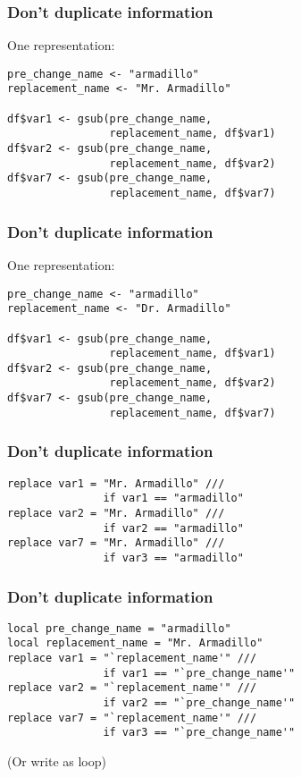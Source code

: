 \documentclass[11pt]{beamer}
\begin{document}
\begin{frame}[fragile]\frametitle{Don't duplicate information}
One representation:
\vspace{0.5cm}
\begin{verbatim}
pre_change_name <- "armadillo"
replacement_name <- "Mr. Armadillo"

df$var1 <- gsub(pre_change_name,
                replacement_name, df$var1)
df$var2 <- gsub(pre_change_name,
                replacement_name, df$var2)
df$var7 <- gsub(pre_change_name,
                replacement_name, df$var7)
\end{verbatim}
\end{frame}


\begin{frame}[fragile]\frametitle{Don't duplicate information}
One representation:
\vspace{1cm}
\begin{verbatim}
pre_change_name <- "armadillo"
replacement_name <- "Dr. Armadillo"

df$var1 <- gsub(pre_change_name,
                replacement_name, df$var1)
df$var2 <- gsub(pre_change_name,
                replacement_name, df$var2)
df$var7 <- gsub(pre_change_name,
                replacement_name, df$var7)
\end{verbatim}
\end{frame}


\begin{frame}[fragile]\frametitle{Don't duplicate information}
\begin{verbatim}
replace var1 = "Mr. Armadillo" ///
               if var1 == "armadillo"
replace var2 = "Mr. Armadillo" ///
               if var2 == "armadillo"
replace var7 = "Mr. Armadillo" ///
               if var3 == "armadillo"
\end{verbatim}
\end{frame}

\begin{frame}[fragile]\frametitle{Don't duplicate information}
\begin{verbatim}
local pre_change_name = "armadillo"
local replacement_name = "Mr. Armadillo"
replace var1 = "`replacement_name'" ///
               if var1 == "`pre_change_name'"
replace var2 = "`replacement_name'" ///
               if var2 == "`pre_change_name'"
replace var7 = "`replacement_name'" ///
               if var3 == "`pre_change_name'"
\end{verbatim}
\pause (Or write as loop)
\end{frame}
\end{document}
